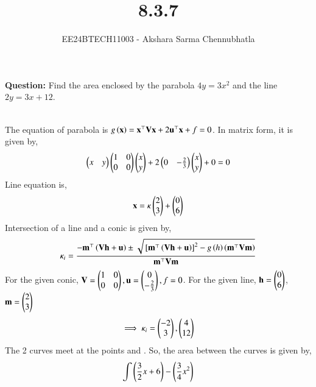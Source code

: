 \documentclass[journal]{IEEEtran}
\begin{document}

\vspace{3cm}

\title{8.3.7}
\author{EE24BTECH11003 - Akshara Sarma Chennubhatla}
{\let\newpage\relax\maketitle}
\textbf{Question:}
Find the area enclosed by the parabola $4y = 3x^2$ and the line $2y = 3x + 12$.

\solution\\

The equation of parabola is $g \left(\mathbf{x}\right) = \mathbf{x}^{\top}\mathbf{V}\mathbf{x} + 2 \mathbf{u}^{\top}\mathbf{x} + f = 0$. In matrix form, it is given by,
\begin{align}
	\begin{pmatrix}x & y\end{pmatrix} \begin{pmatrix}1 & 0 \\ 0 & 0\end{pmatrix} \begin{pmatrix}x \\ y\end{pmatrix} + 2 \begin{pmatrix}0 & -\frac{2}{3}\end{pmatrix} \begin{pmatrix}x \\ y\end{pmatrix} + 0 = 0
\end{align}
Line equation is,
\begin{align}
	\mathbf{x} = \kappa \begin{pmatrix}2 \\ 3\end{pmatrix} + \begin{pmatrix}0 \\ 6\end{pmatrix}
\end{align}
Intersection of a line and a conic is given by,
\begin{align}
	\kappa_i = \frac{-\mathbf{m}^{\top}\left(\mathbf{Vh}+\mathbf{u}\right)\pm\sqrt{{}\left[\mathbf{m}^{\top}\left(\mathbf{Vh}+\mathbf{u}\right)\right]^2-g\left(h\right)\left(\mathbf{m}^{\top}\mathbf{Vm}\right)}}{\mathbf{m}^{\top}\mathbf{Vm}}
\end{align}
For the given conic, $\mathbf{V}=\begin{pmatrix}1 & 0 \\ 0 & 0 \end{pmatrix}, \mathbf{u} = \begin{pmatrix}0 \\ -\frac{2}{3}\end{pmatrix}, f = 0$. For the given line, $\mathbf{h}=\begin{pmatrix}0 \\ 6\end{pmatrix}$, $\mathbf{m}=\begin{pmatrix}2 \\ 3\end{pmatrix}$
\begin{align}	
	\implies \kappa_i = \begin{pmatrix}-2 \\ 3\end{pmatrix}, \begin{pmatrix}4 \\ 12\end{pmatrix}
\end{align}
The 2 curves meet at the points  and . So, the area between the curves is given by,
\begin{align}
	\int{\ensuremath{\left(\frac{3}{2}x + 6\right)} - {\ensuremath{\left(\frac{3}{4}x^2\right)}}}
\end{align}
\end{document}
